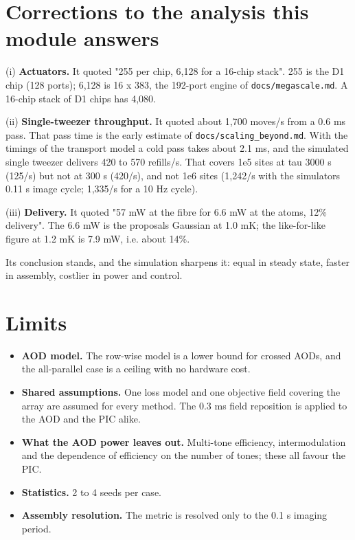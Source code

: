 \hypertarget{5-corrections-to-the-analysis-this-module-answers}{%
\section{Corrections to the analysis this module
answers}\label{aod_comparison-5-corrections-to-the-analysis-this-module-answers}}

(i) \textbf{Actuators.} It quoted "255 per chip, 6,128 for a 16-chip
stack". 255 is the D1 chip (128 ports); 6,128 is 16 x 383, the 192-port
engine of \texttt{docs/megascale.md}. A 16-chip stack of D1 chips has
4,080.

(ii) \textbf{Single-tweezer throughput.} It quoted about 1,700 moves/s
from a 0.6 ms pass. That pass time is the early estimate of
\texttt{docs/scaling\_beyond.md}. With the timings of the transport
model a cold pass takes about 2.1 ms, and the simulated single tweezer
delivers 420 to 570 refills/s. That covers 1e5 sites at tau 3000 s
(125/s) but not at 300 s (420/s), and not 1e6 sites (1,242/s with the
simulator\textquotesingle s 0.11 s image cycle; 1,335/s for a 10 Hz
cycle).

(iii) \textbf{Delivery.} It quoted "57 mW at the fibre for 6.6 mW at the
atoms, 12\% delivery". The 6.6 mW is the proposal\textquotesingle s
Gaussian at 1.0 mK; the like-for-like figure at 1.2 mK is 7.9 mW, i.e.
about 14\%.

Its conclusion stands, and the simulation sharpens it: equal in steady
state, faster in assembly, costlier in power and control.

\hypertarget{6-limits}{%
\section{Limits}\label{aod_comparison-6-limits}}

\begin{itemize}
\tightlist
\item
  \textbf{AOD model.} The row-wise model is a lower bound for crossed
  AODs, and the all-parallel case is a ceiling with no hardware cost.
\item
  \textbf{Shared assumptions.} One loss model and one objective field
  covering the array are assumed for every method. The 0.3 ms field
  reposition is applied to the AOD and the PIC alike.
\item
  \textbf{What the AOD power leaves out.} Multi-tone efficiency,
  intermodulation and the dependence of efficiency on the number of
  tones; these all favour the PIC.
\item
  \textbf{Statistics.} 2 to 4 seeds per case.
\item
  \textbf{Assembly resolution.} The metric is resolved only to the 0.1 s
  imaging period.
\end{itemize}

